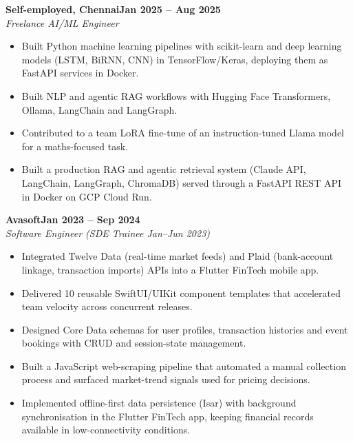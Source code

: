 \documentclass[a4paper,11pt]{article}
\newcommand{\entry}[4]{\needspace{4\baselineskip}\noindent\textbf{#1}\hfill\textbf{#2}\\ \textit{#3}\hfill\textit{#4}\par}
\begin{document}
\vspace{4pt}
\entry{Self-employed, Chennai}{Jan 2025 – Aug 2025}{Freelance AI/ML Engineer}{}
\begin{itemize}
  \item Built Python machine learning pipelines with scikit-learn and deep learning models (LSTM, BiRNN, CNN) in TensorFlow/Keras, deploying them as FastAPI services in Docker.
  \item Built NLP and agentic RAG workflows with Hugging Face Transformers, Ollama, LangChain and LangGraph.
  \item Contributed to a team LoRA fine-tune of an instruction-tuned Llama model for a maths-focused task.
  \item Built a production RAG and agentic retrieval system (Claude API, LangChain, LangGraph, ChromaDB) served through a FastAPI REST API in Docker on GCP Cloud Run.
\end{itemize}
\vspace{4pt}
\entry{Avasoft}{Jan 2023 – Sep 2024}{Software Engineer (SDE Trainee Jan–Jun 2023)}{}
\begin{itemize}
  \item Integrated Twelve Data (real-time market feeds) and Plaid (bank-account linkage, transaction imports) APIs into a Flutter FinTech mobile app.
  \item Delivered 10 reusable SwiftUI/UIKit component templates that accelerated team velocity across concurrent releases.
  \item Designed Core Data schemas for user profiles, transaction histories and event bookings with CRUD and session-state management.
  \item Built a JavaScript web-scraping pipeline that automated a manual collection process and surfaced market-trend signals used for pricing decisions.
  \item Implemented offline-first data persistence (Isar) with background synchronisation in the Flutter FinTech app, keeping financial records available in low-connectivity conditions.
\end{itemize}

\end{document}
